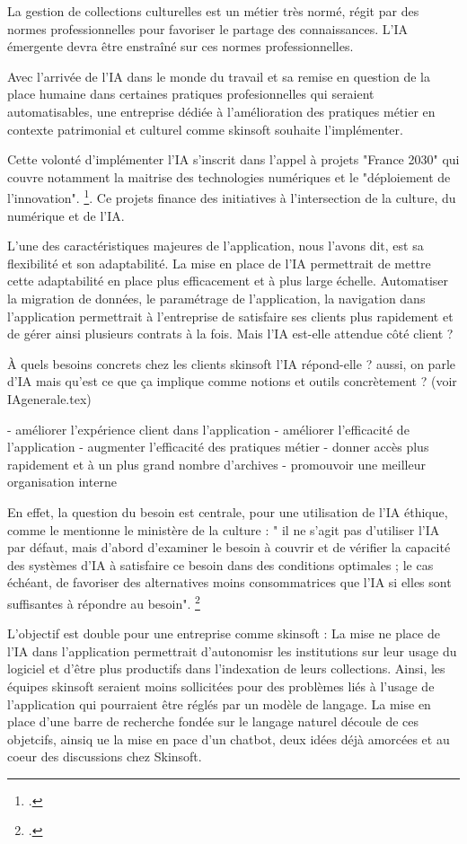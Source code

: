 \begin{itemize}
La gestion de collections culturelles est un métier très normé, régit par des normes professionnelles pour favoriser le partage des connaissances. L'IA émergente devra être enstraîné sur ces normes professionnelles. 

Avec l'arrivée de l'IA dans le monde du travail et sa remise en question de la place humaine dans certaines pratiques profesionnelles qui seraient automatisables, une entreprise dédiée à l'amélioration des pratiques métier en contexte patrimonial et culturel comme skinsoft souhaite l'implémenter. 

Cette volonté d'implémenter l'IA s'inscrit dans l'appel à projets "France 2030" qui couvre notamment la maitrise des technologies numériques et le "déploiement de l'innovation". \footcite{zotero-item-636}. Ce projets finance des initiatives à l'intersection de la culture, du numérique et de l'IA.

L'une des caractéristiques majeures de l'application, nous l'avons dit, est sa flexibilité et son adaptabilité. La mise en place de l'IA permettrait de mettre cette adaptabilité en place plus efficacement et à plus large échelle. Automatiser la migration de données, le paramétrage de l'application, la navigation dans l'application permettrait à l'entreprise de satisfaire ses clients plus rapidement et de gérer ainsi plusieurs contrats à la fois. Mais l'IA est-elle attendue côté client ? 

À quels besoins concrets chez les clients skinsoft l'IA répond-elle ?
aussi, on parle d'IA mais qu'est ce que ça implique comme notions et outils concrètement ? (voir IAgenerale.tex)

- améliorer l'expérience client dans l'application
- améliorer l'efficacité de l'application
- augmenter l'efficacité des pratiques métier 
- donner accès plus rapidement et à un plus grand nombre d'archives 
- promouvoir une meilleur organisation interne

En effet, la question du besoin est centrale, pour une utilisation de l'IA éthique, comme le mentionne le ministère de la culture : " il ne s’agit pas d’utiliser l’IA par défaut, mais d’abord d’examiner le besoin à couvrir et de vérifier la capacité des systèmes d’IA à satisfaire ce
besoin dans des conditions optimales ; le cas échéant, de favoriser des alternatives moins consommatrices que l’IA si elles sont suffisantes à répondre au besoin". \footcite{2025a}

L'objectif est double pour une entreprise comme skinsoft : 
La mise ne place de l'IA dans l'application permettrait d'autonomisr les institutions sur leur usage du logiciel et d'être plus productifs dans l'indexation de leurs collections. 
Ainsi, les équipes skinsoft seraient moins sollicitées pour des problèmes liés à l'usage de l'application qui pourraient être réglés par un modèle de langage. 
La mise en place d'une barre de recherche fondée sur le langage naturel découle de ces objetcifs, ainsiq ue la mise en pace d'un chatbot, deux idées déjà amorcées et au coeur des discussions chez Skinsoft.


\end{itemize}
